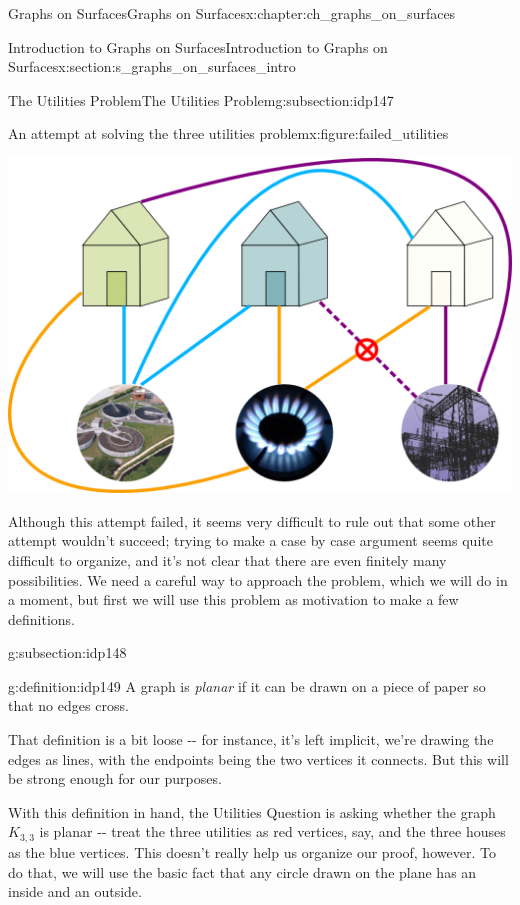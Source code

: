 \documentclass[oneside,10pt,]{book}
\numberwithin{equation}{section}
\begin{document}
\begin{chapterptx}{Graphs on Surfaces}{}{Graphs on Surfaces}{}{}{x:chapter:ch_graphs_on_surfaces}
\begin{sectionptx}{Introduction to Graphs on Surfaces}{}{Introduction to Graphs on Surfaces}{}{}{x:section:s_graphs_on_surfaces_intro}
\begin{subsectionptx}{The Utilities Problem}{}{The Utilities Problem}{}{}{g:subsection:idp147}
\begin{figureptx}{An attempt at solving the three utilities problem}{x:figure:failed_utilities}{}
\begin{image}{0.15}{0.7}{0.15}
\includegraphics[width=\linewidth]{images/The-Utilities-Problem-Bad-Solution.png}
\end{image}%
\tcblower
\end{figureptx}%
Although this attempt failed, it seems very difficult to rule out that some other attempt wouldn't succeed; trying to make a case by case argument seems quite difficult to organize, and it's not clear that there are even finitely many possibilities.  We need a careful way to approach the problem, which we will do in a moment, but first we will use this problem as motivation to make a few definitions.%
\end{subsectionptx}
%
%
\typeout{************************************************}
\typeout{************************************************}
%
\begin{subsectionptx}{}{}{}{}{}{g:subsection:idp148}
\begin{definition}{}{g:definition:idp149}%
A graph is \emph{planar} if it can be drawn on a piece of paper so that no edges cross.%
\end{definition}
That definition is a bit loose -{}-{} for instance, it's left implicit, we're drawing the edges as lines, with the endpoints being the two vertices it connects.  But this will be strong enough for our purposes.%
\par
With this definition in hand, the Utilities Question is asking whether the graph \(K_{3,3}\) is planar -{}-{} treat the three utilities as red vertices, say, and the three houses as the blue vertices.  This doesn't really help us organize our proof, however. To do that, we will use the basic fact that any circle drawn on the plane has an inside and an outside.%
\par

\end{subsectionptx}
\end{sectionptx}
\end{chapterptx}
\end{document}
